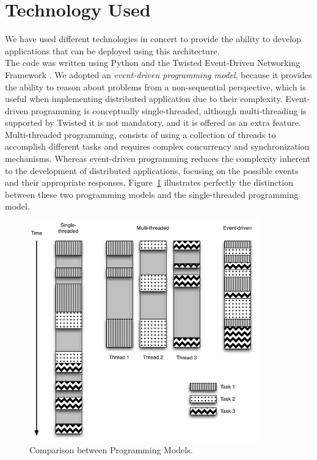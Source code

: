 \documentclass[12pt, titlepage]{uo_temp}
\begin{document}

     \section{Technology Used}
     We have used different technologies in concert to provide the ability to develop
     applications that can be deployed using this architecture.\\ 
     
     The code was written using Python and the Twisted Event-Driven Networking Framework
     \cite{twisted}. We adopted an \emph{event-driven programming model}, because it
     provides the ability to reason about problems from a non-sequential perspective,
     which is useful when implementing distributed application due to their
     complexity. Event-driven programming is conceptually single-threaded, although
     multi-threading is supported by Twisted it is not mandatory, and it is offered as an
     extra feature.
     Multi-threaded programming, consists of using a collection of threads to accomplish
     different tasks and requires complex concurrency and synchronization
     mechanisms. Whereas event-driven programming reduces the complexity inherent to the
     development of distributed applications, focusing on the possible events and their
     appropriate responses. Figure~\ref{multi} illustrates perfectly the distinction
     between these two programming models and the single-threaded programming model.

     \begin{figure}[h]
       \centering
       \includegraphics[width=100mm]{images/twisted_multi.jpg}
       \caption{Comparison between Programming Models. \cite{mckellar2013twisted}}\label{multi}
     \end{figure}
\end{document}
